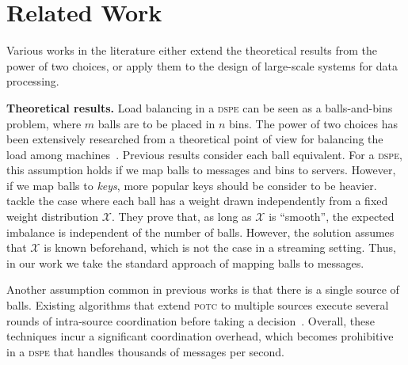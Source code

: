 \documentclass[10pt,conference,letterpaper]{IEEEtran}
\newcommand{\spara}[1]{\smallskip\noindent\textbf{#1}}
\newcommand{\potc}{\textsc{p\textup{o}tc}\xspace}
\newcommand{\dspe}{\textsc{dspe}\xspace}
\begin{document}
 

\section{Related Work}
\label{sec:rel-work}
Various works in the literature either extend the theoretical results from the power of two choices, or apply them to the design of large-scale systems for data processing.

\spara{Theoretical results.}\label{sec:theor_choices}
Load balancing in a \dspe can be seen as a balls-and-bins problem, where $m$ balls are to be placed in $n$ bins.
The power of two choices has been extensively researched from a theoretical point of view for balancing the load among machines~\cite{mitzenmacher2001power,mitzenmacher2001potc-survey}. Previous results consider each ball equivalent.
For a \dspe, this assumption holds if we map balls to messages and bins to servers.
However, if we map balls to {\em keys}, more popular keys should be consider to be heavier.
\citep{talwar2007weightedcase} tackle the case where each ball has a weight drawn independently from a fixed weight distribution $\mathcal{X}$.
They prove that, as long as $\mathcal{X}$ is ``smooth'', the expected imbalance is independent of the number of balls. However, the solution assumes that $\mathcal{X}$ is known beforehand, which is not the case in a streaming setting.
Thus, in our work we take the standard approach of mapping balls to messages.




Another assumption common in previous works is that there is a single source of balls. 
Existing algorithms that extend \potc to multiple sources execute several rounds of intra-source coordination before taking a decision~\cite{adler1995parallelrandomized,lenzen2011parallelrandomized, park2011multiplechoices}.
Overall, these techniques incur a significant coordination overhead, which becomes prohibitive in a \dspe that handles thousands of messages per second.
 
\end{document}
